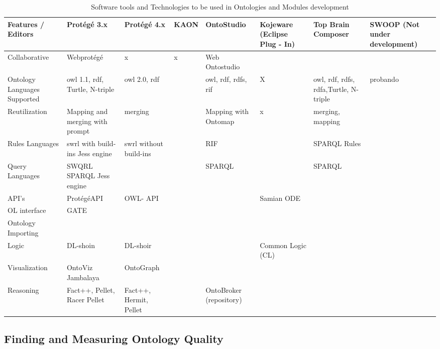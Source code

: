	\begin{table}
		\centering
		\caption{Software tools and Technologies to be used in Ontologies and Modules development} 
		\label{table1}
		\begin{tabulary}{21.0cm}{  L L L L L L L L }
			\hline
			\hline
			
			Features / Editors &  Protégé 3.x & Protégé 4.x & KAON & OntoStudio &  Kojeware (Eclipse Plug - In)& Top Brain Composer & SWOOP  (Not under development) \\  [1ex] \hline
			Collaborative & Webprotégé & x & x & Web Ontostudio & & &\\ [1ex] \hline
			Ontology Languages Supported  & owl 1.1, rdf, Turtle, N-triple &  owl 2.0, rdf &  & owl, rdf, rdfs, rif & X & owl, rdf, rdfs, rdfa,Turtle, N-triple & probando \\ [1ex] \hline
			Reutilization & Mapping and merging with prompt  & merging  &   &  Mapping with Ontomap  &  x & merging, mapping &\\ [1ex] \hline
			Rules Languages  & \gls{swrl} with build-ins Jess engine &  \gls{swrl} without build-ins  &  & RIF &  & SPARQL Rules &\\ [1ex] \hline
			Query Languages  &  SWQRL SPARQL Jess engine  &  &  & SPARQL  & & SPARQL &\\ [1ex] \hline
			API's  &  ProtégéAPI & OWL- API  &  &  &  Samian ODE & &\\ [1ex] \hline
			OL interface  &  GATE  &  &  &  & & & \\ [1ex] \hline
			Ontology Importing  &  &  &  &  & & &\\ [1ex] \hline
			Logic  & DL-shoin  &  DL-shoir &  &  &  Common  Logic (CL) & & \\ [1ex] \hline
			Visualization  &  OntoViz Jambalaya & OntoGraph &  &  &  & &\\ [1ex] \hline
			Reasoning  & Fact++, Pellet, Racer Pellet & Fact++, Hermit, Pellet &  &  OntoBroker (repository)  & & &\\ [1ex] \hline
		\end{tabulary}
	\end{table}







\subsection{Finding and Measuring Ontology Quality}\label{4.5}

